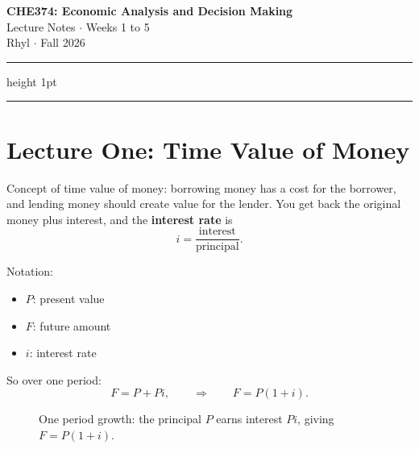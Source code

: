 \documentclass[11pt]{article}
\newcommand{\term}[1]{\textbf{\textcolor{cTerm}{#1}}}
\begin{document}
\begin{center}
  {\LARGE\bfseries\color{cHead} CHE374: Economic Analysis and Decision Making}\\[4pt]
  {\large\color{cTerm} Lecture Notes \;$\cdot$\; Weeks 1 to 5}\\[6pt]
  {\normalsize Rhyl \;$\cdot$\; Fall 2026}
\end{center}
\vspace{2pt}
{\color{cHead}\hrule height 1pt}
\vspace{6pt}

\tableofcontents
\vspace{6pt}
{\color{cHead!40}\hrule}
\bigskip

\section{Lecture One: Time Value of Money}

Concept of time value of money: borrowing money has a cost for the borrower,
and lending money should create value for the lender. You get back the
original money plus interest, and the \term{interest rate} is
\[
i = \frac{\text{interest}}{\text{principal}}.
\]

Notation:
\begin{itemize}[nosep]
  \item $P$: present value
  \item $F$: future amount
  \item $i$: interest rate
\end{itemize}

So over one period:
\[
F = P + Pi, \qquad\Longrightarrow\qquad F = P(1+i).
\]

\begin{figure}[h]
\centering
{}
\caption*{One period growth: the principal $P$ earns interest $Pi$, giving $F=P(1+i)$.}
\end{figure}
\end{document}

